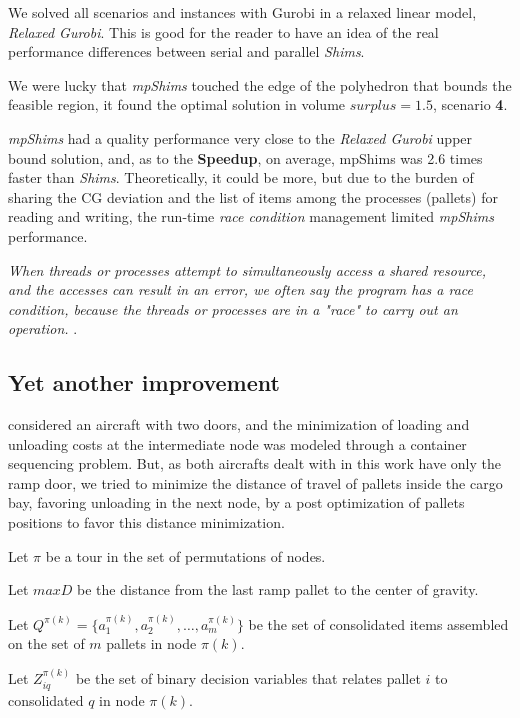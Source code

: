 \documentclass[preprint,authoryear]{elsarticle}
\begin{document}
We solved all scenarios and instances with Gurobi in a relaxed linear model, {\it Relaxed Gurobi}. This is good for the reader to have an idea of the real performance differences between serial and parallel {\it Shims}.

We were lucky that {\it mpShims} touched the edge of the polyhedron that bounds the feasible region, it found the optimal solution in volume $surplus = 1.5$, scenario {\bf 4}.

{\it mpShims} had a quality performance very close to the {\it Relaxed Gurobi} upper bound solution, and, as to the {\bf Speedup}, on average, mpShims was 2.6 times faster than {\it Shims}. Theoretically, it could be more, but due to the burden of sharing the CG deviation and the list of items among the processes (pallets) for reading and writing, the run-time {\it race condition} management limited {\it mpShims} performance.

{\it When threads or processes attempt to simultaneously access a shared resource, and the accesses can result in an error, we often say the program has a race condition, because the threads or processes are in a "race" to carry out an operation.} \cite[p. 53]{Pacheco:2020}.

\subsection{Yet another improvement}
\label{improvement}

\cite{LurkinSchyns2015} considered an aircraft with two doors, and the minimization of loading and unloading costs at the intermediate node was modeled through a container sequencing problem. But, as both aircrafts dealt with in this work have only the ramp door, we tried to minimize the distance of travel of pallets inside the cargo bay, favoring unloading in the next node, by a post optimization of pallets positions to favor this distance minimization.

Let $\pi$ be a tour in the set of permutations of nodes.

Let $maxD$ be the distance from the last ramp pallet to the center of gravity.

Let $Q^{\pi(k)}  = \{ a^{\pi(k)}_1, a^{\pi(k)}_2, \ldots, a^{\pi(k)}_m \}$ be the set of consolidated items assembled on the set of $m$ pallets in node $\pi(k)$.

Let $Z^{\pi(k)}_{iq}$ be the set of binary decision variables that relates pallet $i$ to consolidated $q$ in node $\pi(k)$.
\end{document}
